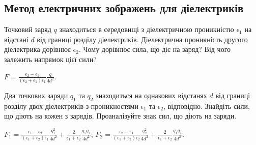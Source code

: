 \subsection*{Метод електричних зображень для діелектриків}

\begin{problem}
    Точковий заряд $q$ знаходиться в середовищі з діелектричною проникністю $\epsilon_1$ на відстані $d$ від границі розділу діелектриків. Діелектрична проникність другого діелектрика дорівнює $\epsilon_2$. Чому дорівнює сила, що діє на заряд? Від чого залежить напрямок цієї сили?
\begin{solution}
	$F = \frac{\epsilon_2 - \epsilon_1}{(\epsilon_2 + \epsilon_1)\epsilon_1} \frac{q}{4d^2}$.
\end{solution}
\end{problem}

\begin{problem}%
    Два точкових заряди $q_1$ та $q_2$ знаходиться на однакових відстанях $d$ від границі розділу двох діелектриків з проникностями $\epsilon_1$ та $\epsilon_2$, відповідно. Знайдіть сили, що діють на кожен з зарядів. Проаналізуйте знак сил, що діють на заряди.
\begin{solution}
	$F_1 = \frac{\epsilon_1 - \epsilon_2}{(\epsilon_1 + \epsilon_2)\epsilon_1} \frac{q_1^2}{4d^2} + \frac{2}{\epsilon_1 + \epsilon_2} \frac{q_1q_2}{4d^2}$,
	$F_2 = \frac{\epsilon_2 - \epsilon_1}{(\epsilon_1 + \epsilon_2)\epsilon_2} \frac{q_2^2}{4d^2} + \frac{2}{\epsilon_1 + \epsilon_2} \frac{q_1q_2}{4d^2}$.	
\end{solution}
\end{problem}

